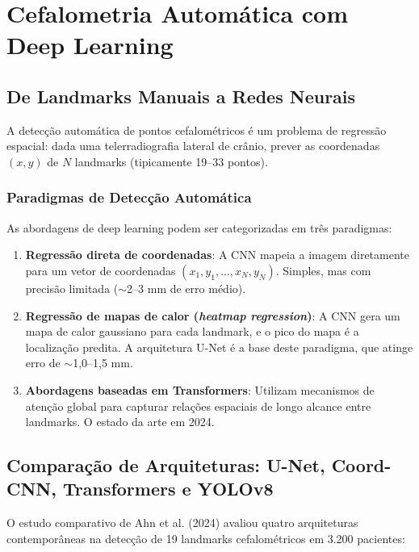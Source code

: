 \section{Cefalometria Automática com Deep Learning}

\subsection{De Landmarks Manuais a Redes Neurais}

A detecção automática de pontos cefalométricos é um problema de regressão espacial: dada uma telerradiografia lateral de crânio, prever as coordenadas $(x, y)$ de $N$ landmarks (tipicamente 19--33 pontos).

\subsubsection{Paradigmas de Detecção Automática}

As abordagens de deep learning podem ser categorizadas em três paradigmas:

\begin{enumerate}
    \item \textbf{Regressão direta de coordenadas}: A CNN mapeia a imagem diretamente para um vetor de coordenadas $(x_1, y_1, ..., x_N, y_N)$. Simples, mas com precisão limitada ($\sim$2--3 mm de erro médio).

    \item \textbf{Regressão de mapas de calor (\textit{heatmap regression})}: A CNN gera um mapa de calor gaussiano para cada landmark, e o pico do mapa é a localização predita. A arquitetura U-Net é a base deste paradigma, que atinge erro de $\sim$1,0--1,5 mm.

    \item \textbf{Abordagens baseadas em Transformers}: Utilizam mecanismos de atenção global para capturar relações espaciais de longo alcance entre landmarks. O estado da arte em 2024.
\end{enumerate}

\subsection{Comparação de Arquiteturas: U-Net, Coord-CNN, Transformers e YOLOv8}

O estudo comparativo de Ahn et al. (2024) avaliou quatro arquiteturas contemporâneas na detecção de 19 landmarks cefalométricos em 3.200 pacientes:

